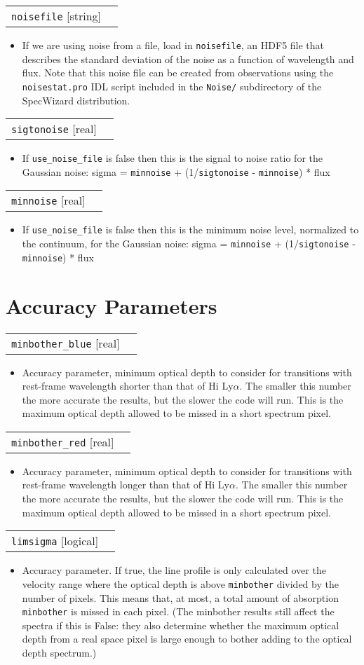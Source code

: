 \documentclass{report}
\makeatletter
\newcommand{\paramdefinition}[3]{
\begin{tabular*}{\textwidth}{l@{\extracolsep{\fill}}r}
		{\tt #1} [{\sc #2}]& #3 \\
\end{tabular*}}
\newcommand{\paramdescription}[1]{
\begin{itemize}
\item #1
\end{itemize}\vspace{0.2cm}}
\makeatother
\begin{document}
\paramdefinition{noisefile}{string}{}
\paramdescription{If we are using noise from a file, load in {\tt noisefile}, an HDF5 file that describes the standard deviation of the noise as a function of wavelength and flux.  Note that this noise file can be created from observations using the {\tt noisestat.pro} IDL script included in the {\tt Noise/} subdirectory of the SpecWizard distribution.}

\paramdefinition{sigtonoise}{real}{}
\paramdescription{If {\tt use\_noise\_file} is false then this is the signal to noise ratio for the Gaussian noise: sigma = {\tt minnoise} + (1/{\tt sigtonoise} - {\tt minnoise}) * flux}

\paramdefinition{minnoise}{real}{}
\paramdescription{If {\tt use\_noise\_file} is false then this is the minimum noise level, normalized to the continuum, for the Gaussian noise: sigma = {\tt minnoise} + (1/{\tt sigtonoise} - {\tt minnoise}) * flux}

\section{Accuracy Parameters}

\paramdefinition{minbother\_blue}{real}{}
\paramdescription{Accuracy parameter, minimum optical depth to consider for transitions with rest-frame wavelength shorter than that of H{\sc i} Ly$\alpha$.  The smaller this number the more accurate the results, but the slower the code will run. This is the maximum optical depth allowed to be missed in a short spectrum pixel.}

\paramdefinition{minbother\_red}{real}{}
\paramdescription{Accuracy parameter, minimum optical depth to consider for transitions with rest-frame wavelength longer than that of H{\sc i} Ly$\alpha$.  The smaller this number the more accurate the results, but the slower the code will run. This is the maximum optical depth allowed to be missed in a short spectrum pixel.}

\paramdefinition{limsigma}{logical}{}
\paramdescription{Accuracy parameter. If true, the line profile is only calculated over the velocity range where the optical depth is above {\tt minbother} divided by the number of pixels. This means that, at most, a total amount of absorption {\tt minbother} is missed in each pixel. (The minbother results still affect the spectra if this is False: they also determine whether the maximum optical depth from a real space pixel is large enough to bother adding to the optical depth spectrum.)}
\end{document}
